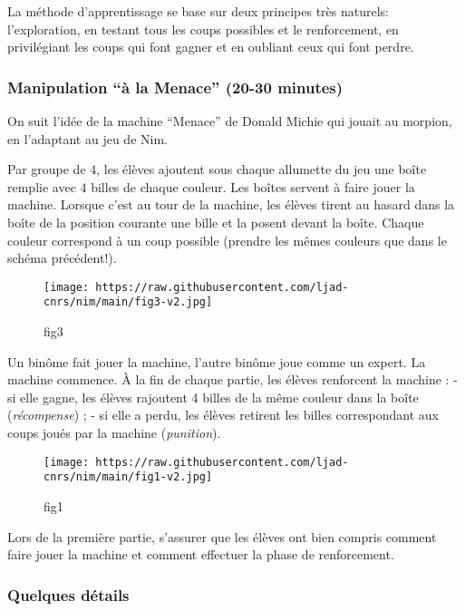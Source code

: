 La méthode d'apprentissage se base sur deux principes très naturels:
l'exploration, en testant tous les coups possibles et le renforcement,
en privilégiant les coups qui font gagner et en oubliant ceux qui font
perdre.

\hypertarget{manipulation-uxe0-la-menace-20-30-minutes}{%
\subsubsection{Manipulation ``à la Menace'' (20-30
minutes)}\label{manipulation-uxe0-la-menace-20-30-minutes}}

On suit l'idée de la machine ``Menace'' de Donald Michie qui jouait au
morpion, en l'adaptant au jeu de Nim.

Par groupe de 4, les élèves ajoutent sous chaque allumette du jeu une
boîte remplie avec 4 billes de chaque couleur. Les boîtes servent à
faire jouer la machine. Lorsque c'est au tour de la machine, les élèves
tirent au hasard dans la boîte de la position courante une bille et la
posent devant la boîte. Chaque couleur correspond à un coup possible
(prendre les mêmes couleurs que dans le schéma précédent!).

\begin{figure}
\centering
\texttt{[image: https://raw.githubusercontent.com/ljad-cnrs/nim/main/fig3-v2.jpg]}
\caption{fig3}
\end{figure}

Un binôme fait jouer la machine, l'autre binôme joue comme un expert. La
machine commence. À la fin de chaque partie, les élèves renforcent la
machine : - si elle gagne, les élèves rajoutent 4 billes de la même
couleur dans la boîte (\emph{récompense}) ; - si elle a perdu, les
élèves retirent les billes correspondant aux coups joués par la machine
(\emph{punition}).

\begin{figure}
\centering
\texttt{[image: https://raw.githubusercontent.com/ljad-cnrs/nim/main/fig1-v2.jpg]}
\caption{fig1}
\end{figure}

Lors de la première partie, s'assurer que les élèves ont bien compris
comment faire jouer la machine et comment effectuer la phase de
renforcement.

\hypertarget{quelques-duxe9tails}{%
\subsubsection{Quelques détails}\label{quelques-duxe9tails}}

